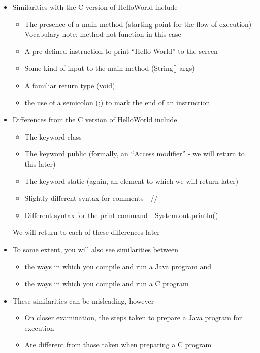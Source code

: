 \documentclass{beamer}
\begin{document}
\begin{frame}
\begin{itemize}
\item Similarities with the C version of HelloWorld include
\begin{itemize}
\item The presence of a main method (starting point for the flow of execution) - Vocabulary note: method not function in this case
\item A pre-defined instruction to print ``Hello World'' to the screen
\item Some kind of input to the main method (String[] args)
\item A familiar return type (void)
\item the use of a semicolon (;) to mark the end of an instruction
\end{itemize}
\end{itemize}
\end{frame}

\begin{frame}
\begin{itemize}
\item Differences from the C version of HelloWorld include
\begin{itemize}
\item The keyword class
\item The keyword public (formally, an ``Access modifier'' - we will return to this later)
\item The keyword static (again, an element to which we will return later)
\item Slightly different syntax for comments - //
\item Different syntax for the print command - System.out.println() 
\end{itemize}
We will return to each of these differences later
\end{itemize}
\end{frame}

\begin{frame}\begin{itemize}

\item To some extent, you will also see similarities between 

\begin{itemize}
\item the ways in which you compile and run a Java program and
\item the ways in which you compile and run a C program
\end{itemize}
\item These similarities can be misleading, however

\begin{itemize}
\item On closer examination, the steps taken to prepare a Java program for
execution
\item Are different from those taken when preparing a C program
\end{itemize}
\end{itemize}\end{frame}
\end{document}
